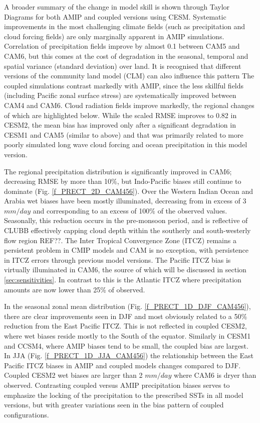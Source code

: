 A broader summary of the change in model skill is shown through Taylor Diagrams \citep[Fig.\ref{f_TAYLOR_CAM_CESM},][]{Taylor2001} for both AMIP and coupled versions using CESM. Systematic improvements in the most challenging climate fields (such as precipitation and cloud forcing fields) are only marginally apparent in AMIP simulations. Correlation of precipitation fields improve by almost 0.1 between CAM5 and CAM6, but this comes at the cost of degradation in the seasonal, temporal and spatial variance (standard deviation) over land. It is recognised that different versions of the community land model (CLM) can also influence this pattern  The coupled simulations contrast markedly with AMIP, since the less skillful fields (including Pacific zonal surface stress) are systematically improved between CAM4 and CAM6. Cloud radiation fields improve markedly, the regional changes of which are highlighted below. While the scaled RMSE improves to 0.82 in CESM2, the mean bias has improved only after a significant degradation in CESM1 and CAM5 (similar to above) and that was primarily related to more poorly simulated long wave cloud forcing and ocean precipitation in this model version.

The regional precipitation distribution is significantly improved in CAM6; decreasing RMSE by more than 10$\%$, but Indo-Pacific biases still continue to dominate (Fig. \ref{f_PRECT_2D_CAM456}). Over the Western Indian Ocean and Arabia wet biases have been mostly illuminated, decreasing from in excess of 3 $mm/day$ and corresponding to an excess of 100$\%$ of the observed values. Seasonally, this reduction occurs in the pre-monsoon period, and is reflective of CLUBB effectively capping cloud depth within the southerly and south-westerly flow region REF??. The Inter Tropical Convergence Zone (ITCZ) remains a persistent problem in CMIP models \citep{Tian2020} and CAM is no exception, with persistence in ITCZ errors through previous model versions. The Pacific ITCZ bias is virtually illuminated in CAM6, the source of which will be discussed in section \ref{sec:sensitivities}. In contrast to this is the Atlantic ITCZ where precipitation amounts are now lower than 25\% of observed.

In the seasonal zonal mean distribution (Fig. \ref{f_PRECT_1D_DJF_CAM456}), there are clear improvements seen in DJF and most obviously related to a 50\% reduction from the East Pacific ITCZ. This is not reflected in coupled CESM2, where wet biases reside mostly to the South of the equator. Similarly in CESM1 and CCSM4, where AMIP biases tend to be small, the coupled bias are largest. In JJA (Fig. \ref{f_PRECT_1D_JJA_CAM456}) the relationship between the East Pacific ITCZ biases in AMIP and coupled models changes compared to DJF. Coupled CESM2 wet biases are larger than 2 $mm/day$ where CAM6 is dryer than observed. Contrasting coupled versus AMIP precipitation biases serves to emphasize the locking of the precipitation to the prescribed SSTs in all model versions, but with greater variations seen in the bias pattern of coupled configurations.

